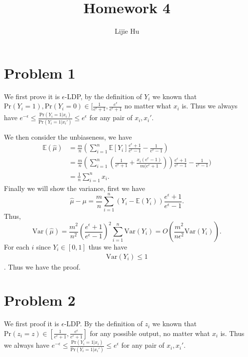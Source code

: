 \documentclass[11pt]{article}
\date{\displaydate{date}}
\begin{document}
\author{Lijie Hu}
\title{Homework 4}
\date{}
\maketitle
\section{Problem 1}
We first prove it is $\epsilon$-LDP, by the definition of $Y_i$ we known that $\text{Pr}(Y_i=1), \text{Pr}(Y_i=0) \in [\frac{1}{e^\epsilon+1}, \frac{e^\epsilon}{e^\epsilon+1}$
no matter what $x_i$ is. Thus we always have $e^{-\epsilon}\leq \frac{\text{Pr}(Y_i=1|x_i)}{\text{Pr}(Y_i=1|x_i')}\leq e^\epsilon$ for any pair of $x_i, x_i'$. 

We then consider the unbiaseness, we have 
\begin{align*}
\mathbb{E}(\hat{\mu}) &= \frac{m}{n}(\sum_{i=1}^n \mathbb{E}[Y_i]\frac{e^\epsilon+1}{e^\epsilon-1}-	\frac{1}{e^\epsilon-1})\\
&=\frac{m}{n}(\sum_{i=1}^n (\frac{1}{e^\epsilon+1}+\frac{x_i (e^\epsilon-1)}{m (e^\epsilon+1})) \frac{e^\epsilon+1}{e^\epsilon-1}-	\frac{1}{e^\epsilon-1})\\
&=\frac{1}{n}\sum_{i=1}^n x_i. 
\end{align*}
Finally we will show the variance, first we have 
\begin{equation}
	\hat{\mu}-\mu= \frac{m}{n}\sum_{i=1}^n(Y_i-\mathbb{E}(Y_i))\frac{e^\epsilon+1}{e^\epsilon-1}.
\end{equation}
Thus, 
\begin{equation}
	\text{Var}(\hat{\mu})=\frac{m^2}{n^2}(\frac{e^\epsilon+1}{e^\epsilon-1})^2\sum_{i=1}^n \text{Var}(Y_i)=O(\frac{m^2}{n\epsilon^2} \text{Var}(Y_i)).
\end{equation}
For each $i$ since $Y_i\in [0, 1]$ thus we have
\begin{align*}
	\text{Var}(Y_i)\leq 1
	\end{align*}.
	Thus we have the proof. 
	\section{Problem 2}
	We first proof it is $\epsilon$-LDP.  By the definition of $z_i$ we known that $\text{Pr}(z_i=z)\in [\frac{1}{e^\epsilon+1}, \frac{e^\epsilon}{e^\epsilon+1}]$ for any possible output, 
no matter what $x_i$ is. Thus we always have $e^{-\epsilon}\leq \frac{\text{Pr}(Y_i=1|x_i)}{\text{Pr}(Y_i=1|x_i')}\leq e^\epsilon$ for any pair of $x_i, x_i'$. 
\end{document}
